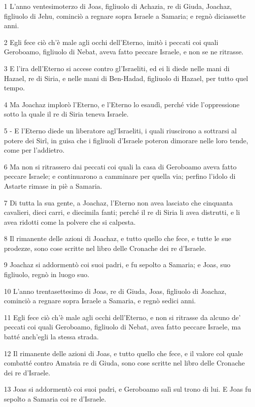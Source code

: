 \par 1 L'anno ventesimoterzo di Joas, figliuolo di Achazia, re di Giuda, Joachaz, figliuolo di Jehu, cominciò a regnare sopra Israele a Samaria; e regnò diciassette anni.
\par 2 Egli fece ciò ch'è male agli occhi dell'Eterno, imitò i peccati coi quali Geroboamo, figliuolo di Nebat, aveva fatto peccare Israele, e non se ne ritrasse.
\par 3 E l'ira dell'Eterno si accese contro gl'Israeliti, ed ei li diede nelle mani di Hazael, re di Siria, e nelle mani di Ben-Hadad, figliuolo di Hazael, per tutto quel tempo.
\par 4 Ma Joachaz implorò l'Eterno, e l'Eterno lo esaudì, perché vide l'oppressione sotto la quale il re di Siria teneva Israele.
\par 5 - E l'Eterno diede un liberatore agl'Israeliti, i quali riuscirono a sottrarsi al potere dei Sirî, in guisa che i figliuoli d'Israele poteron dimorare nelle loro tende, come per l'addietro.
\par 6 Ma non si ritrassero dai peccati coi quali la casa di Geroboamo aveva fatto peccare Israele; e continuarono a camminare per quella via; perfino l'idolo di Astarte rimase in piè a Samaria.
\par 7 Di tutta la sua gente, a Joachaz, l'Eterno non avea lasciato che cinquanta cavalieri, dieci carri, e diecimila fanti; perché il re di Siria li avea distrutti, e li avea ridotti come la polvere che si calpesta.
\par 8 Il rimanente delle azioni di Joachaz, e tutto quello che fece, e tutte le sue prodezze, sono cose scritte nel libro delle Cronache dei re d'Israele.
\par 9 Joachaz si addormentò coi suoi padri, e fu sepolto a Samaria; e Joas, suo figliuolo, regnò in luogo suo.
\par 10 L'anno trentasettesimo di Joas, re di Giuda, Joas, figliuolo di Joachaz, cominciò a regnare sopra Israele a Samaria, e regnò sedici anni.
\par 11 Egli fece ciò ch'è male agli occhi dell'Eterno, e non si ritrasse da alcuno de' peccati coi quali Geroboamo, figliuolo di Nebat, avea fatto peccare Israele, ma batté anch'egli la stessa strada.
\par 12 Il rimanente delle azioni di Joas, e tutto quello che fece, e il valore col quale combatté contro Amatsia re di Giuda, sono cose scritte nel libro delle Cronache dei re d'Israele.
\par 13 Joas si addormentò coi suoi padri, e Geroboamo salì sul trono di lui. E Joas fu sepolto a Samaria coi re d'Israele.
